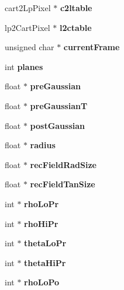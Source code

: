\begin{DoxyCompactItemize}
\item 
cart2\+Lp\+Pixel $\ast$ {\bfseries c2ltable}\label{classoFlow_a7bb0f6978c87687e2a8b49baf90b55fe}

\item 
lp2\+Cart\+Pixel $\ast$ {\bfseries l2ctable}\label{classoFlow_a13cbbce2cb582f2f334457514a4dd441}

\item 
unsigned char $\ast$ {\bfseries current\+Frame}\label{classoFlow_ab3c97961c068249c62064da78e69920e}

\item 
int {\bfseries planes}\label{classoFlow_a114376c9a159d78cf296b4518a0d38c7}

\item 
float $\ast$ {\bfseries pre\+Gaussian}\label{classoFlow_a9cca7dd33a2070f7e771a566d6edfeb4}

\item 
float $\ast$ {\bfseries pre\+Gaussian\+T}\label{classoFlow_a116d105ade9cd773cdbb0f284e0191b6}

\item 
float $\ast$ {\bfseries post\+Gaussian}\label{classoFlow_a85de1b0fa9897788c6839aa6d8c92077}

\item 
float $\ast$ {\bfseries radius}\label{classoFlow_a0f1769167bc865d8af78d8afc9dddcf1}

\item 
float $\ast$ {\bfseries rec\+Field\+Rad\+Size}\label{classoFlow_ac49ad64ee830515f292fd8a1140efe11}

\item 
float $\ast$ {\bfseries rec\+Field\+Tan\+Size}\label{classoFlow_aa37cb0756686465c9959e7b846eff877}

\item 
int $\ast$ {\bfseries rho\+Lo\+Pr}\label{classoFlow_ac07dac6a5376ff5b1067204f1a729a28}

\item 
int $\ast$ {\bfseries rho\+Hi\+Pr}\label{classoFlow_ae6dd5db423754b043fd2f6640a548e61}

\item 
int $\ast$ {\bfseries theta\+Lo\+Pr}\label{classoFlow_a08d3b1f11ce5ea738b7df0c630f33156}

\item 
int $\ast$ {\bfseries theta\+Hi\+Pr}\label{classoFlow_a13357734a10d2425d40b4a32d79063c7}

\item 
int $\ast$ {\bfseries rho\+Lo\+Po}\label{classoFlow_acb981f4882aefebc924ed6570a146a3e}


\end{DoxyCompactItemize}
